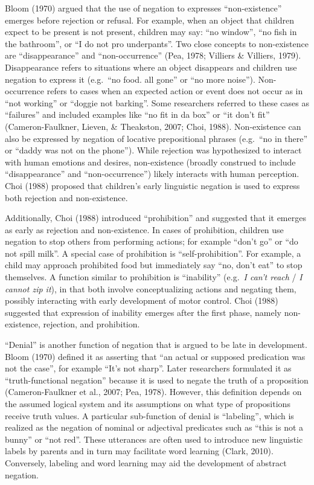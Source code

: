 \documentclass[
  english,
  man,floatsintext]{apa6}
\begin{document}
Bloom (1970) argued that the use of negation to expresses \enquote{non-existence} emerges before rejection or refusal. For example, when an object that children expect to be present is not present, children may say: \enquote{no window}, \enquote{no fish in the bathroom}, or \enquote{I do not pro underpants}. Two close concepts to non-existence are \enquote{disappearance} and \enquote{non-occurrence} (Pea, 1978; Villiers \& Villiers, 1979). Disappearance refers to situations where an object disappears and children use negation to express it (e.g.~\enquote{no food. all gone} or \enquote{no more noise}). Non-occurrence refers to cases when an expected action or event does not occur as in \enquote{not working} or \enquote{doggie not barking}. Some researchers referred to these cases as \enquote{failures} and included examples like \enquote{no fit in da box} or \enquote{it don't fit} (Cameron-Faulkner, Lieven, \& Theakston, 2007; Choi, 1988). Non-existence can also be expressed by negation of locative prepositional phrases (e.g.~\enquote{no in there} or \enquote{daddy was not on the phone}). While rejection was hypothesized to interact with human emotions and desires, non-existence (broadly construed to include \enquote{disappearance} and \enquote{non-occurrence}) likely interacts with human perception. Choi (1988) proposed that children's early linguistic negation is used to express both rejection and non-existence.

Additionally, Choi (1988) introduced \enquote{prohibition} and suggested that it emerges as early as rejection and non-existence. In cases of prohibition, children use negation to stop others from performing actions; for example \enquote{don't go} or \enquote{do not spill milk}. A special case of prohibition is \enquote{self-prohibition}. For example, a child may approach prohibited food but immediately say \enquote{no, don't eat} to stop themselves. A function similar to prohibition is \enquote{inability} (e.g.~\emph{I can't reach} / \emph{I cannot zip it}), in that both involve conceptualizing actions and negating them, possibly interacting with early development of motor control. Choi (1988) suggested that expression of inability emerges after the first phase, namely non-existence, rejection, and prohibition.

\enquote{Denial} is another function of negation that is argued to be late in development. Bloom (1970) defined it as asserting that \enquote{an actual or supposed predication was not the case}, for example \enquote{It's not sharp}. Later researchers formulated it as \enquote{truth-functional negation} because it is used to negate the truth of a proposition (Cameron-Faulkner et al., 2007; Pea, 1978). However, this definition depends on the assumed logical system and its assumptions on what type of propositions receive truth values. A particular sub-function of denial is \enquote{labeling}, which is realized as the negation of nominal or adjectival predicates such as \enquote{this is not a bunny} or \enquote{not red}. These utterances are often used to introduce new linguistic labels by parents and in turn may facilitate word learning (Clark, 2010). Conversely, labeling and word learning may aid the development of abstract negation.
\end{document}
